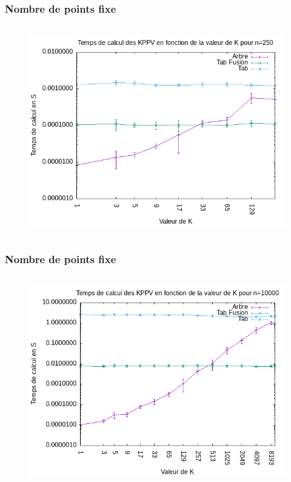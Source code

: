 \documentclass{beamer}
\begin{document}
\begin{frame}
\frametitle{Nombre de points fixe}
\begin{columns}
    \begin{figure}
      \includegraphics[width=\textwidth]{img_graph/graph_n_250.png}
    \end{figure}
\end{columns}
\end{frame}

\begin{frame}
\frametitle{Nombre de points fixe}
\begin{columns}
    \begin{figure}
      \includegraphics[width=\textwidth]{img_graph/graph_n_10000.png}
    \end{figure}
\end{columns}
\end{frame}
\end{document}
